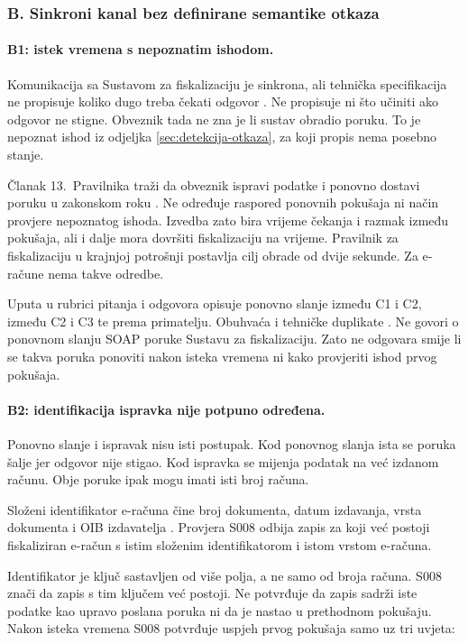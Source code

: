 \subsubsection*{B. Sinkroni kanal bez definirane semantike otkaza}

\paragraph{B1: istek vremena s nepoznatim ishodom.}
Komunikacija sa Sustavom za fiskalizaciju je sinkrona, ali tehnička
specifikacija ne propisuje koliko dugo treba čekati odgovor
\cite{pu2026tehspec}. Ne propisuje ni što učiniti ako odgovor ne stigne.
Obveznik tada ne zna je li sustav obradio poruku. To je nepoznat ishod iz
odjeljka \ref{sec:detekcija-otkaza}, za koji propis nema posebno stanje.

Članak 13.\ Pravilnika traži da obveznik ispravi podatke i ponovno dostavi
poruku u zakonskom roku \cite{nn2026pravilnikeracun}. Ne određuje raspored
ponovnih pokušaja ni način provjere nepoznatog ishoda. Izvedba zato bira
vrijeme čekanja i razmak između pokušaja, ali i dalje mora dovršiti
fiskalizaciju na vrijeme. Pravilnik za fiskalizaciju u krajnjoj potrošnji
postavlja cilj obrade od dvije sekunde. Za e-račune nema takve odredbe.

Uputa u rubrici pitanja i odgovora opisuje ponovno slanje između C1 i C2,
između C2 i C3 te prema primatelju. Obuhvaća i tehničke duplikate
\cite{pu2026pitanjaodgovori}. Ne govori o ponovnom slanju SOAP poruke
Sustavu za fiskalizaciju. Zato ne odgovara smije li se takva poruka ponoviti
nakon isteka vremena ni kako provjeriti ishod prvog pokušaja.

\paragraph{B2: identifikacija ispravka nije potpuno određena.}
\label{sec:b2}
Ponovno slanje i ispravak nisu isti postupak. Kod ponovnog slanja ista se
poruka šalje jer odgovor nije stigao. Kod ispravka se mijenja podatak na
već izdanom računu. Obje poruke ipak mogu imati isti broj računa.

Složeni identifikator e-računa čine broj dokumenta, datum izdavanja, vrsta
dokumenta i OIB izdavatelja \cite{pu2026tehspec}. Provjera S008 odbija
zapis za koji već postoji fiskaliziran e-račun s istim složenim
identifikatorom i istom vrstom e-računa.

Identifikator je ključ sastavljen od više polja, a ne samo od broja računa.
S008 znači da zapis s tim ključem već postoji. Ne potvrđuje da zapis sadrži
iste podatke kao upravo poslana poruka ni da je nastao u prethodnom
pokušaju. Nakon isteka vremena S008 potvrđuje uspjeh prvog pokušaja samo uz
tri uvjeta:

